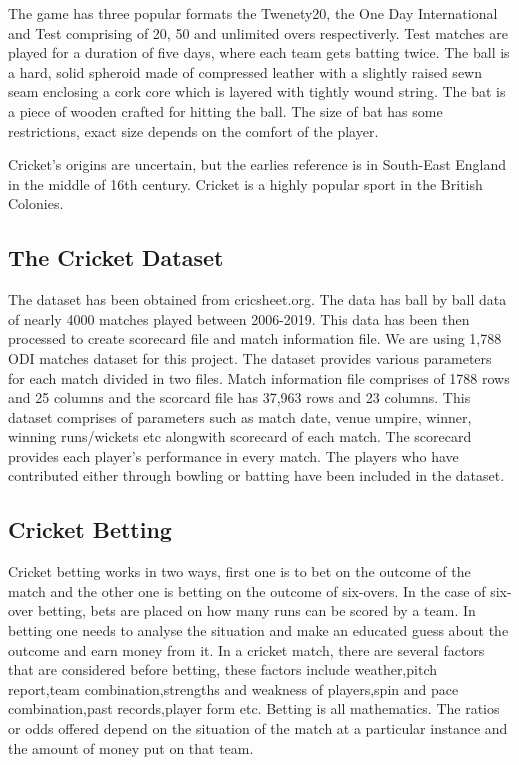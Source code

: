 \documentclass[fleqn,10pt]{wlscirep}
\begin{document}
The game has three popular formats the Twenety20, the One Day International and Test comprising of 20, 50 and unlimited overs respectiverly. Test matches are played for a
duration of five days, where each team gets batting twice.
The ball is a hard, solid spheroid made of compressed leather with a slightly raised sewn seam enclosing a cork core which is layered with tightly wound string. The bat is a
piece of wooden crafted for hitting the ball. The size of bat has some restrictions, exact size depends on the comfort of the player.

Cricket's origins are uncertain, but the earlies reference is in South-East England in the middle of 16th century. Cricket is a highly popular sport 
in the British Colonies.

\subsection{The Cricket Dataset}
The dataset has been obtained from cricsheet.org. The data has ball by ball data of nearly 4000 matches played
between 2006-2019. This data has been then processed to create scorecard file and match information file.
We are using 1,788 ODI matches dataset for this project. The dataset provides various parameters for each match divided in two files.
Match information file comprises of 1788 rows and 25 columns and the scorcard file has 37,963 rows and 23 columns.
This dataset comprises of parameters such as match date, venue umpire, winner, winning runs/wickets etc alongwith scorecard of each match.
The scorecard provides each player's performance in every match. The players who have contributed either through bowling or batting have been included in the dataset.

\subsection{Cricket Betting}
Cricket betting works in two ways, first one is to bet on the outcome of the match and the other one is betting on the outcome of six-overs.
In the case of six-over betting, bets are placed on how many runs can be scored by a team. 
In betting one needs to  analyse the situation and make an educated guess about the outcome and earn money from it. 
In a cricket match, there are several factors that are considered before betting, these factors include weather,pitch report,team combination,strengths and weakness of players,spin and pace combination,past records,player form etc. 
Betting is all mathematics. The ratios or odds offered depend on the situation of the match at a particular instance and the amount of money put on that team.
\end{document}
